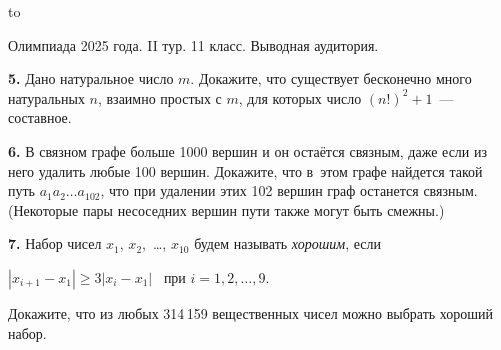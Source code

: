\documentclass[12pt]{article}
\def\q#1.{{\bf #1. }}
\def\dotline{\smallskip\hbox to \hsize{\dotfill}\medskip}
\begin{document}
\dotline

\centerline{Олимпиада 2025 года. II тур. 11 класс. Выводная аудитория.}
\smallskip

\q5. Дано натуральное число $m$. Докажите, что существует бесконечно
много натуральных $n$, взаимно простых с $m$, для которых
число $(n!)^2+1$~--- составное.
 
\q6. В связном графе больше 1000 вершин и он остаётся связным, даже если из него удалить любые 100 вершин. Докажите, что в~этом графе найдется такой путь $a_1a_2 \ldots a_{102}$, что при удалении этих 102 вершин граф останется связным. (Некоторые пары несоседних вершин пути также могут быть смежны.)
 
\q7. Набор чисел $x_1$, $x_2$,~\dots, $x_{10}$ будем называть \emph{хорошим}, если 

\smallskip
\centerline{$|x_{i+1}-x_1|\geq 3|x_i-x_1|$ \ при $i=1,2,\ldots,9$.} 
\smallskip

Докажите, что из любых 314\,159 вещественных чисел можно выбрать хороший набор.
\end{document}
